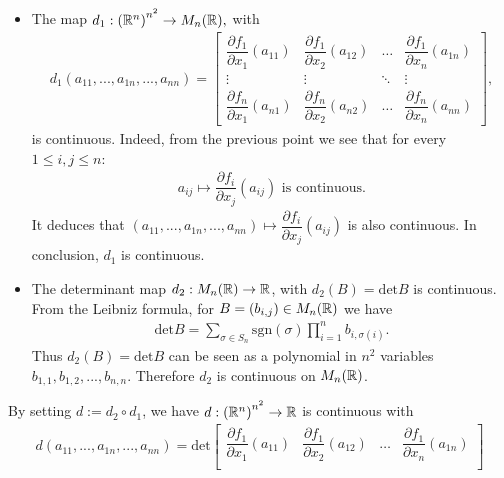 \begin{problem}
\begin{solution}
\begin{enumerate}
\begin{itemize}
        \item The map $d_1: \left(\mathbb{R}^n\right)^{n^2} \rightarrow M_n (\mathbb{R}),$ with 
        \begin{align*}
            d_1 \left(
            a_{11},...,a_{1n},...,a_{nn}\right) 
            =  
            \begin{bmatrix}
            \dfrac{\partial f_1}{\partial x_1}(a_{11}) & \dfrac{\partial f_1}{\partial x_2}(a_{12}) & \dots & \dfrac{\partial f_1}{\partial x_n}(a_{1n}) \\
            \vdots & \vdots & \ddots & \vdots \\
            \dfrac{\partial f_n}{\partial x_1}(a_{n1}) & \dfrac{\partial f_n}{\partial x_2}(a_{n2}) & \dots & \dfrac{\partial f_n}{\partial x_n}(a_{nn}) 
            \end{bmatrix},
        \end{align*} 
        is continuous. Indeed, from the previous point we see that for every $1\le i,j \le n$:
        \begin{align*}
            a_{ij} \mapsto \dfrac{\partial f_i }{\partial x_j} (a_{ij}) \text{ is continuous.}
        \end{align*}
        It deduces that $\left(
            a_{11},...,a_{1n},...,a_{nn}\right) \mapsto \dfrac{\partial f_i }{\partial x_j} (a_{ij})$ is also continuous. In conclusion, $d_1$ is continuous.
        \item The determinant map $d_2: M_n (\mathbb{R}) \rightarrow \mathbb{R}$, with $d_2 (B) = \mathrm{det}B$ is continuous. From the Leibniz formula, for $B=(b_{i,j}) \in M_n(\mathbb{R})$ we have
        \begin{align*}
            \mathrm{det}B = \displaystyle\sum\limits_{\sigma\in S_n} \mathrm{sgn}(\sigma) \displaystyle\prod\limits_{i=1}^n b_{i,\sigma (i)}.
        \end{align*}
        Thus $d_2 (B) = \mathrm{det}B$ can be seen as a polynomial in $n^2$ variables $b_{1,1},b_{1,2},...,b_{n,n}$. Therefore $d_2$ is continuous on $M_n (\mathbb{R})$. 
    \end{itemize}
    By setting $d:= d_2 \circ d_1$, we have $d: \left(\mathbb{R}^n\right)^{n^2} \rightarrow \mathbb{R}$ is continuous with 
    \begin{align*}
         d \left(
            a_{11},...,a_{1n},...,a_{nn}\right) 
            =  \mathrm{det}
            \begin{bmatrix}
            \dfrac{\partial f_1}{\partial x_1}(a_{11}) & \dfrac{\partial f_1}{\partial x_2}(a_{12}) & \dots & \dfrac{\partial f_1}{\partial x_n}(a_{1n}) \\

\end{bmatrix}
\end{align*}
\end{enumerate}
\end{solution}
\end{problem}
